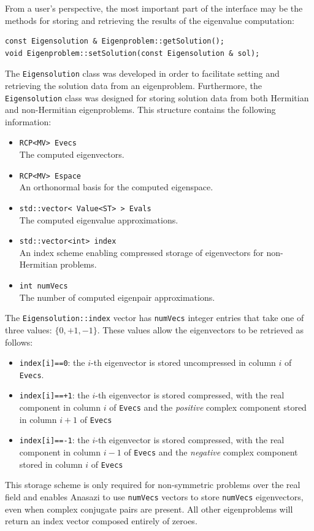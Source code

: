 \documentclass[acmtoms]{acmtrans2m}
\newcommand{\aspace}[1]{\texttt{#1}}
\begin{document}
From a user's perspective, the most important part of the interface may be the methods 
for storing and retrieving the results of the eigenvalue computation:
\begin{verbatim}
const Eigensolution & Eigenproblem::getSolution();
void Eigenproblem::setSolution(const Eigensolution & sol);
\end{verbatim}
The \aspace{Eigensolution} class was developed in order to
facilitate setting and retrieving the solution data from an eigenproblem.  
Furthermore, the \aspace{Eigensolution} class was designed for storing
solution data from both Hermitian and non-Hermitian eigenproblems. 
This structure contains the following information:
\begin{itemize}
  \item \verb!RCP<MV> Evecs! \\
   The computed eigenvectors.
 \item \verb!RCP<MV> Espace! \\
   An orthonormal basis for the computed eigenspace.
 \item \verb!std::vector< Value<ST> > Evals! \\
   The computed eigenvalue approximations.
 \item \verb!std::vector<int> index! \\
   An index scheme enabling compressed storage of eigenvectors for non-Hermitian problems.
 \item \verb!int numVecs! \\
   The number of computed eigenpair approximations.
\end{itemize}
The \aspace{Eigensolution::index} vector has \aspace{numVecs} integer entries that take 
one of three values: $\{0, +1, -1\}$. These values allow the eigenvectors to be retrieved as follows:
\begin{itemize}
  \item \aspace{index[i]==0}: the $i$-th eigenvector is stored uncompressed in column $i$ of
    \verb!Evecs!.
  \item \aspace{index[i]==+1}: the $i$-th eigenvector is stored compressed, with the real
    component in column $i$ of \verb!Evecs! and the \emph{positive} complex component
    stored in column $i+1$ of \verb!Evecs!
  \item \aspace{index[i]==-1}: the $i$-th eigenvector is stored compressed, with the real
    component in column $i-1$ of \verb!Evecs! and the \emph{negative} complex component
    stored in column $i$ of \verb!Evecs!
\end{itemize}
This storage scheme is only required for non-symmetric problems over the real field and enables
Anasazi to use \aspace{numVecs} vectors to store \aspace{numVecs} eigenvectors, even when
complex conjugate pairs are present.  All other eigenproblems will return an index vector 
composed entirely of zeroes. 
\end{document}
